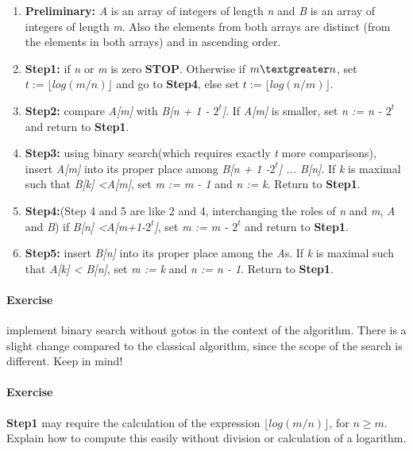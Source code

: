\documentclass{article}
\newcommand{\percents}[1]{\protect \marginpar[l]{\bf [#1]}}
\newcounter{question}
\newcommand{\question}[1]{
  \addtocounter{question}{1}
  \paragraph{Exercise~\arabic{question}  \percents{#1}}
 }
\begin{document}
\begin{enumerate}
\item \textbf {Preliminary:} {\it A} is an array of integers of length
  {\it n} and {\it B} is an array of integers of length {\it m}. Also
  the elements from both arrays are distinct (from the elements in
  both arrays) and in ascending order. 

\item \textbf{Step1:} if {\it n} or {\it m} is zero
  \textbf{STOP}. Otherwise if  $m\textgreater n$, set $t := \lfloor log
    \left ( m \slash n \right ) \rfloor $  and go to \textbf{Step4},
    else set $t := \lfloor log
    \left ( n \slash m \right ) \rfloor $.

\item \textbf{Step2:} compare {\it A[m]} with {\it B[n + 1 -
    $2^t$]}. If {\it A[m]} is smaller, set {\it n := n - $2^t$} and
  return to \textbf{Step1}.

\item \textbf{Step3:} using binary search(which requires exactly {\it
    t} more comparisons), insert {\it A[m]} into its proper place
  among {\it B[n + 1 -$2^t$] ... B[n]}. If {\it k} is maximal such
  that {\it B[k] \textless A[m]}, set {\it m := m - 1} and {\it n :=
    k}. Return to \textbf{Step1}.

\item \textbf{Step4:}(Step 4 and 5 are like 2 and 4, interchanging the
  roles of {\it n} and {\it m}, {\it A} and {\it B}) if {\it B[n]
    \textless A[m+1-$2^t$]}, set {\it m := m - $2^t$} and return to
  \textbf{Step1}.

\item \textbf{Step5:} insert {\it B[n]} into its proper place among
  the {\it A}s. If {\it k} is maximal such that {\it A[k] \textless
    B[n]}, set {\it m := k} and {\it n := n - 1}. Return to \textbf{Step1}.


\end{enumerate}


\question{*} 

implement binary search without gotos in the context of the
algorithm. There is a slight change compared to the classical
algorithm, since the scope of the search is different. Keep in mind! 

\question{*} 

\textbf{Step1} may require the calculation of the expression $\lfloor log
    \left ( m \slash n \right ) \rfloor $, for $n \geq m$. Explain how
    to compute this easily without division or calculation of a
    logarithm.  
\end{document}
